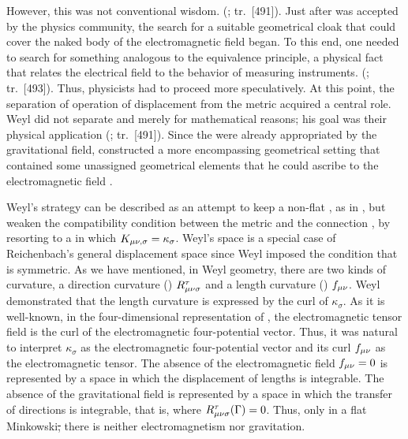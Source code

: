 \documentclass[submitted]{article}
\renewcommand{\Mink}{Minkowski\xspace}
\newcommand{\faradaymn}{\ensuremath{f\mn}}
\newcommand{\faraday}{\ensuremath{f}}
\renewcommand{\rzlap}[2]{(\cite[#1]{Reichenbach1928}; tr.\ [#2])\xspace}
\begin{document}
However, this was not conventional wisdom.  \rzlap{352}{491}. Just after \gr was accepted by the physics community, the search for a suitable geometrical cloak that could cover the naked body of the electromagnetic field began. To this end, one needed to search for something analogous to the equivalence principle, a physical fact that relates the electrical field to the behavior of measuring instruments.  \rzlap{354}{493}. Thus, physicists had to proceed more speculatively. At this point, the separation of operation of displacement from the metric acquired a central role. Weyl did not separate \Gtmn and \gmn merely for mathematical reasons; his goal was their physical application \rzlap{354}{491}. Since the \gmn were already appropriated by the gravitational field, \citet{Weyl1918a} constructed a more encompassing geometrical setting that contained some unassigned geometrical elements that he could ascribe to the electromagnetic field .

Weyl's strategy can be described as an attempt to keep a non-flat \spti, as in \gr, but weaken the compatibility condition between the metric \gmn and the connection \Gtnm, by resorting to a  in which $K_{\mu \nu, \sigma} =\kappa_\sigma$. Weyl's space is a special case of Reichenbach's general displacement space since Weyl imposed the condition that \Gtmn is symmetric. As we have mentioned, in Weyl geometry, there are two kinds of curvature, a direction curvature () $R_{\mu \nu \sigma}^{\tau}$ and a length curvature () $\faraday\mn$. Weyl demonstrated that the length curvature is expressed by the curl of $\kappa_\sigma$. As it is well-known, in the four-dimensional representation of \Maxwell \ed, the electromagnetic tensor field is the curl of the electromagnetic four-potential vector. Thus, it was natural to interpret $\kappa_\sigma$ as the electromagnetic four-potential vector and its curl $f_{\mu\nu}$ as the electromagnetic tensor. The absence of the electromagnetic field $\faradaymn = 0$ is represented by a space in which the displacement of lengths is integrable. The absence of the gravitational field is represented by a space in which the transfer of directions is integrable, that is, where $R_{\mu \nu \sigma}^{\tau}(\Gamma)= 0$. Thus, only in a flat \Mink \st, there is neither electromagnetism nor gravitation.
\end{document}
